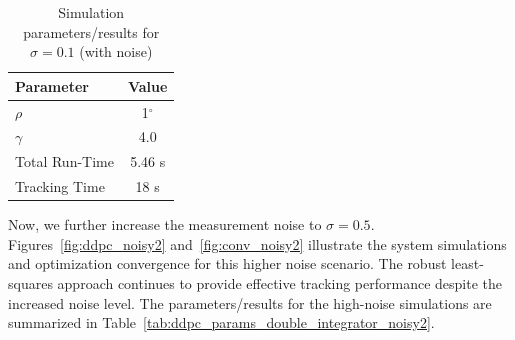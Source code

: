 \newpage
\begin{table}[h]
    \centering
    \begin{tabular}{l|c}
        \textbf{Parameter} & \textbf{Value} \\
        \hline 
        \hline
        $\rho$ & 1$^\circ$ \\
        $\gamma$ & 4.0 \\
        Total Run-Time & 5.46 s \\
        Tracking Time & 18 s \\
        \hline
    \end{tabular}
    \caption{Simulation parameters/results for $\sigma=0.1$ (with noise)}
    \label{tab:ddpc_params_double_integrator_noisy1}
\end{table}

Now, we further increase the measurement noise to $\sigma = 0.5$. Figures~\ref{fig:ddpc_noisy2} and~\ref{fig:conv_noisy2} illustrate the system simulations and optimization convergence for this higher noise scenario. The robust least-squares approach continues to provide effective tracking performance despite the increased noise level. The parameters/results for the high-noise simulations are summarized in Table~\ref{tab:ddpc_params_double_integrator_noisy2}.

